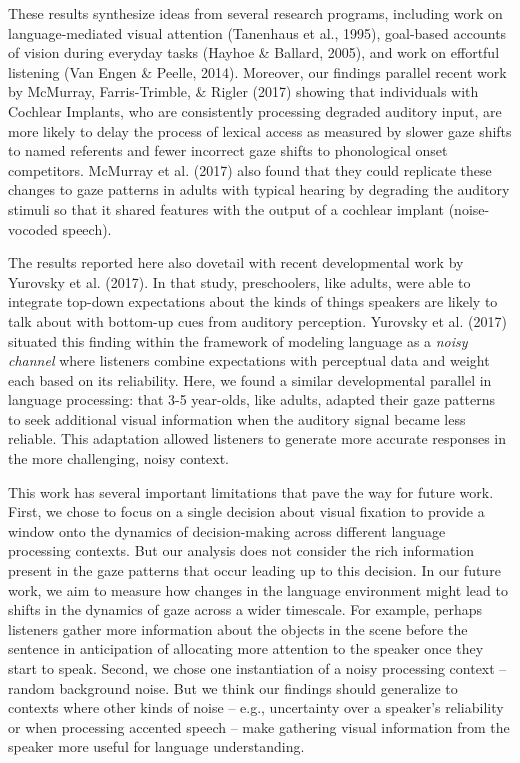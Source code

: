 \documentclass[10pt, letterpaper]{article}
\begin{document}
These results synthesize ideas from several research programs, including
work on language-mediated visual attention (Tanenhaus et al., 1995),
goal-based accounts of vision during everyday tasks (Hayhoe \& Ballard,
2005), and work on effortful listening (Van Engen \& Peelle, 2014).
Moreover, our findings parallel recent work by McMurray, Farris-Trimble,
\& Rigler (2017) showing that individuals with Cochlear Implants, who
are consistently processing degraded auditory input, are more likely to
delay the process of lexical access as measured by slower gaze shifts to
named referents and fewer incorrect gaze shifts to phonological onset
competitors. McMurray et al. (2017) also found that they could replicate
these changes to gaze patterns in adults with typical hearing by
degrading the auditory stimuli so that it shared features with the
output of a cochlear implant (noise-vocoded speech).

The results reported here also dovetail with recent developmental work
by Yurovsky et al. (2017). In that study, preschoolers, like adults,
were able to integrate top-down expectations about the kinds of things
speakers are likely to talk about with bottom-up cues from auditory
perception. Yurovsky et al. (2017) situated this finding within the
framework of modeling language as a \emph{noisy channel} where listeners
combine expectations with perceptual data and weight each based on its
reliability. Here, we found a similar developmental parallel in language
processing: that 3-5 year-olds, like adults, adapted their gaze patterns
to seek additional visual information when the auditory signal became
less reliable. This adaptation allowed listeners to generate more
accurate responses in the more challenging, noisy context.

This work has several important limitations that pave the way for future
work. First, we chose to focus on a single decision about visual
fixation to provide a window onto the dynamics of decision-making across
different language processing contexts. But our analysis does not
consider the rich information present in the gaze patterns that occur
leading up to this decision. In our future work, we aim to measure how
changes in the language environment might lead to shifts in the dynamics
of gaze across a wider timescale. For example, perhaps listeners gather
more information about the objects in the scene before the sentence in
anticipation of allocating more attention to the speaker once they start
to speak. Second, we chose one instantiation of a noisy processing
context -- random background noise. But we think our findings should
generalize to contexts where other kinds of noise -- e.g., uncertainty
over a speaker's reliability or when processing accented speech -- make
gathering visual information from the speaker more useful for language
understanding.
\end{document}
